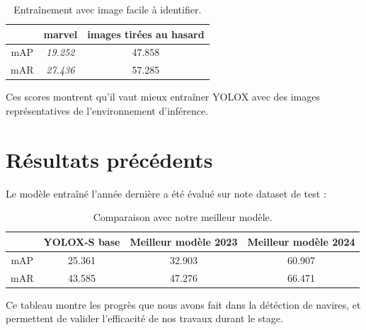 \begin{table}[H]
    \begin{center}
        \begin{tabular}{c c c}
            \hline
            & marvel & images tirées au hasard\\
            \hline
            mAP & \textit{19.252} & 47.858 \\
            mAR & \textit{27.436} & 57.285 \\
        \end{tabular}
    \end{center}
    \caption{Entraînement avec image facile à identifier.}
\end{table}

Ces scores montrent qu'il vaut mieux entraîner YOLOX avec des images représentatives de
l'environnement d'inférence.

\section{Résultats précédents}

Le modèle entraîné l'année dernière a été évalué sur note dataset de test : \\

\begin{table}[h]
    \begin{center}
        \begin{tabular}{c c c c}
            \hline
            & YOLOX-S base & Meilleur modèle 2023 & \textbf{Meilleur modèle 2024} \\
            \hline
            mAP & 25.361 & 32.903 & 60.907 \\
            mAR & 43.585 & 47.276 & 66.471 \\
        \end{tabular}
    \end{center}
    \caption{Comparaison avec notre meilleur modèle.}
\end{table}

Ce tableau montre les progrès que nous avons fait dans la détéction de navires,
et permettent de valider l'efficacité de nos travaux durant le stage.

